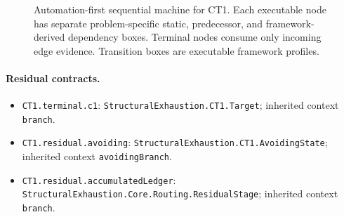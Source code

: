 \begin{landscape}
\begin{figure}[p]
\begin{adjustbox}{max totalsize={\linewidth}{0.72\textheight},center}
%
\end{adjustbox}
\caption{Automation-first sequential machine for CT1. Each executable node has separate problem-specific static, predecessor, and framework-derived dependency boxes. Terminal nodes consume only incoming edge evidence. Transition boxes are executable framework profiles.}
\label{fig:ct1-machine}
\end{figure}
\end{landscape}

\begingroup\small\sloppy
\paragraph{Residual contracts.}
\begin{itemize}
\item \texttt{CT1.\allowbreak{}terminal.\allowbreak{}c1}: \texttt{Structural\allowbreak{}Exhaustion.\allowbreak{}CT1.\allowbreak{}Target}; inherited context \texttt{branch}.
\item \texttt{CT1.\allowbreak{}residual.\allowbreak{}avoiding}: \texttt{Structural\allowbreak{}Exhaustion.\allowbreak{}CT1.\allowbreak{}Avoiding\allowbreak{}State}; inherited context \texttt{avoiding\allowbreak{}Branch}.
\item \texttt{CT1.\allowbreak{}residual.\allowbreak{}accumulated\allowbreak{}Ledger}: \texttt{Structural\allowbreak{}Exhaustion.\allowbreak{}Core.\allowbreak{}Routing.\allowbreak{}Residual\allowbreak{}Stage}; inherited context \texttt{branch}.
\end{itemize}

